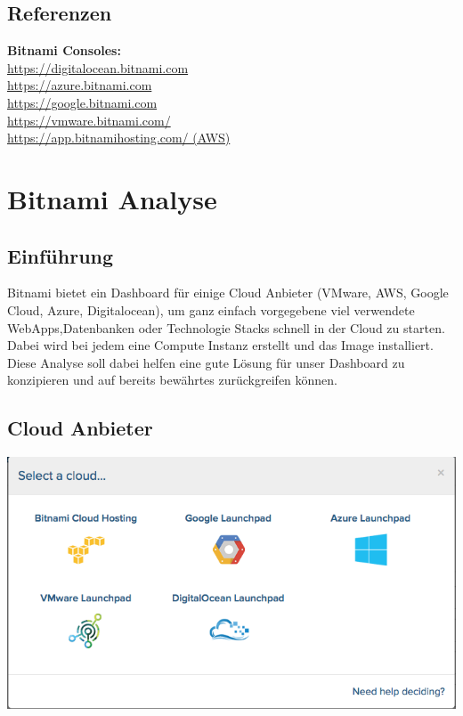
\subsection{Referenzen}
\textbf{Bitnami Consoles:}\\
\href{https://digitalocean.bitnami.com}{https://digitalocean.bitnami.com}\\
\href{https://azure.bitnami.com}{https://azure.bitnami.com}\\
\href{https://google.bitnami.com}{https://google.bitnami.com}\\
\href{https://vmware.bitnami.com/}{https://vmware.bitnami.com/}\\
\href{https://app.bitnamihosting.com/}{https://app.bitnamihosting.com/ (AWS)}\\

\section{Bitnami Analyse}
\subsection{Einführung}
Bitnami bietet ein Dashboard für einige Cloud Anbieter (VMware, AWS, Google Cloud, Azure, 
Digitalocean), um ganz einfach vorgegebene viel verwendete WebApps,Datenbanken oder Technologie Stacks 
schnell in der Cloud zu starten.
Dabei wird bei jedem eine Compute Instanz erstellt und das Image installiert.
Diese Analyse soll dabei helfen eine gute Lösung für unser Dashboard zu 
konzipieren und auf bereits bewährtes zurückgreifen können.

\subsection{Cloud Anbieter}
\includegraphics[width=\textwidth]{./03_Analyse/03_Bitnami/images/clouds}
